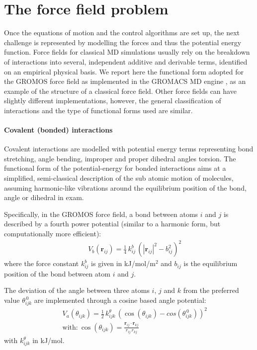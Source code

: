 \section{The force field problem} \label{sec:ff}

Once the equations of motion and the control algorithms are set up, the next challenge is represented by modelling the forces and thus the potential energy function.
%
Force fields for classical MD simulations usually rely on the breakdown of interactions into several, independent additive and derivable terms, identified on an empirical physical basis. We report here the functional form adopted for the GROMOS force field \cite{Oostenbrink2004,Schmid2011} as implemented in the GROMACS MD engine \cite{Berendsen1995,Abraham2015,gromacs_man}, as an example of the structure of a classical force field.
%
Other force fields can have slightly different implementations, however, the general classification of interactions and the type of functional forms used are similar.

\paragraph{Covalent (bonded) interactions} Covalent interactions are modelled with potential energy terms representing bond stretching, angle bending, improper and proper dihedral angles torsion.
%
The functional form of the potential-energy for bonded interactions aims at a simplified, semi-classical description of the sub atomic motion of molecules, assuming harmonic-like vibrations around the equilibrium position of the bond, angle or dihedral in exam.

Specifically, in the GROMOS force field, a bond between atoms $i$ and $j$ is described by a fourth power potential (similar to a harmonic form, but computationally more efficient):
\begin{eqnarray}
&& V_b(\textbf{r}_{ij}) = \frac{1}{4}\,k^b_{ij}\,\left(|\textbf{r}_{ij}|^2 - b_{ij}^2\right)^2
\end{eqnarray}
where the force constant $k^b_{ij}$ is given in kJ/mol/m$^2$ and $b_{ij}$ is the equilibrium position of the bond between atom $i$ and $j$.

The deviation of the angle between three atoms $i$, $j$ and $k$ from the preferred value $\theta^{\, 0}_{ijk}$ are implemented through a cosine based angle potential:
\begin{eqnarray}
&& V_a(\theta_{ijk}) = \frac{1}{2}\,k^\theta_{ijk}\,\left(\cos\left(\theta_{ijk}\right) - cos\left(\theta^{\, 0}_{ijk}\right)\right)^2 \\
&& \text{with:} \ \cos\left(\theta_{ijk}\right) = \frac{\textbf{r}_{ij}\cdot \textbf{r}_{kj}}{r_{ij}\,r_{kj}}
\end{eqnarray}
with $k^\theta_{ijk}$ in kJ/mol.

